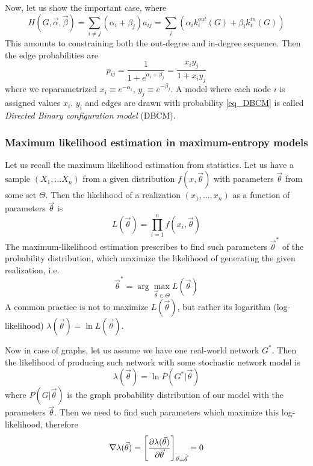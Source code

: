 Now, let us show the important case, where
\begin{equation}
    H(G,\vec{\alpha},\vec{\beta}) = \sum_{i\neq j}(\alpha_i + \beta_j)a_{ij} = \sum_i(\alpha_i k_i^{out}(G) + \beta_i k_i^{in}(G))
\end{equation}
This amounts to constraining both the out-degree and in-degree sequence. Then the edge probabilities are
\begin{equation}
    p_{ij} = \frac{1}{1 + e^{\alpha_i + \beta_j}} = \frac{x_i y_j}{1 + x_i y_j}
    \label{eq_DBCM}
\end{equation}
where we reparametrized $x_i \equiv e^{-\alpha_i}$, $y_j \equiv e^{-\beta_j}$. A model where each node $i$ is assigned values $x_i$, $y_i$ and edges are drawn with probability \ref{eq_DBCM} is called \textit{Directed Binary configuration model} (DBCM).

\subsubsection{Maximum likelihood estimation in maximum-entropy models}
Let us recall the maximum likelihood estimation from statistics. Let us have a sample $(X_1, \dots X_n)$ from a given distribution $f(x, \vec{\theta})$ with parameters $\vec{\theta}$ from some set $\Theta$. Then the likelihood of a realization $(x_1, \dots, x_n)$ as a function of parameters $\vec{\theta}$ is
\begin{equation}
    L(\vec{\theta}) = \prod_{i=1}^n f(x_i, \vec{\theta})
\end{equation}
The maximum-likelihood estimation prescribes to find such parameters $\vec{\theta}^{*}$ of the probability distribution, which maximize the likelihood of generating the given realization, i.e.
\begin{equation}
    \vec{\theta}^{*} = \arg\max_{\vec{\theta} \in \Theta} L(\vec{\theta})
\end{equation}
A common practice is not to maximize $L(\vec{\theta})$, but rather its logarithm (log-likelihood) $\lambda(\vec{\theta}) = \ln L(\vec{\theta})$.

Now in case of graphs, let us assume we have one real-world network $G^*$. Then the likelihood of producing such network with some stochastic network model is 
\begin{equation}
    \lambda(\vec{\theta}) = \ln P(G^*|\vec{\theta})
\end{equation}
where $P(G|\vec{\theta})$ is the graph probability distribution of our model with the parameters $\vec{\theta}$. Then we need to find such parameters which maximize this log-likelihood, therefore
\begin{equation}
    \nabla \lambda(\vec{\theta}) = \left[\frac{\partial \lambda(\vec{\theta})}{\partial \vec{\theta}} \right]_{\vec{\theta} = \hat{\vec{\theta}}} = 0
\end{equation}

